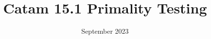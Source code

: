 \documentclass{article}
\begin{document}
\title{Catam 15.1 Primality Testing}
\date{September 2023}
\end{document}
